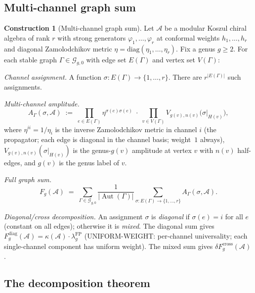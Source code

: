 \documentclass[11pt]{article}
\theoremstyle{definition}
\newtheorem{construction}[theorem]{Construction}
\theoremstyle{remark}
\newcommand{\cA}{\mathcal{A}}
\newcommand{\cG}{\mathcal{G}}
\newcommand{\FP}{\mathrm{FP}}
\newcommand{\diag}{\mathrm{diag}}
\newcommand{\cross}{\mathrm{cross}}
\DeclareMathOperator{\Aut}{Aut}
\numberwithin{equation}{section}
\begin{document}
\subsection{Multi-channel graph sum}

\begin{construction}[Multi-channel graph sum]\label{constr:multi-channel}
Let $\cA$ be a modular Koszul chiral algebra of rank $r$
with strong generators $\varphi_1, \ldots, \varphi_r$ at
conformal weights $h_1, \ldots, h_r$ and diagonal
Zamolodchikov metric
$\eta = \diag(\eta_1, \ldots, \eta_r)$.
Fix a genus $g \geq 2$.
For each stable graph $\Gamma \in \cG_{g,0}$ with edge
set $E(\Gamma)$ and vertex set $V(\Gamma)$:

\emph{Channel assignment.}
A function $\sigma \colon E(\Gamma) \to \{1, \ldots, r\}$.
There are $r^{|E(\Gamma)|}$ such assignments.

\emph{Multi-channel amplitude.}
\begin{equation}\label{eq:multi-channel-amplitude}
 A_{\Gamma}(\sigma, \cA)
 \;:=\;
 \prod_{e \in E(\Gamma)} \eta^{\sigma(e)\sigma(e)}
 \;\cdot\;
 \prod_{v \in V(\Gamma)}
 V_{g(v), n(v)}\!\bigl(\sigma|_{H(v)}\bigr),
\end{equation}
where $\eta^{ii} = 1/\eta_i$ is the inverse Zamolodchikov
metric in channel $i$ (the propagator; each edge is diagonal
in the channel basis; weight~$1$ always),
$V_{g(v), n(v)}(\sigma|_{H(v)})$ is the genus-$g(v)$
amplitude at vertex $v$ with $n(v)$ half-edges, and
$g(v)$ is the genus label of $v$.

\emph{Full graph sum.}
\begin{equation}\label{eq:full-graph-sum}
 F_g(\cA)
 \;=\;
 \sum_{\Gamma \in \cG_{g,0}}
 \frac{1}{|\Aut(\Gamma)|}
 \sum_{\sigma \colon E(\Gamma) \to \{1,\ldots,r\}}
 A_{\Gamma}(\sigma, \cA).
\end{equation}

\emph{Diagonal/cross decomposition.}
An assignment $\sigma$ is \emph{diagonal} if
$\sigma(e) = i$ for all $e$ (constant on all edges);
otherwise it is \emph{mixed}.
The diagonal sum gives
$F_g^{\diag}(\cA) = \kappa(\cA) \cdot \lambda_g^{\FP}$
(UNIFORM-WEIGHT: per-channel universality; each single-channel
component has uniform weight).
The mixed sum gives $\delta F_g^{\cross}(\cA)$.
\end{construction}

\subsection{The decomposition theorem}
\end{document}
